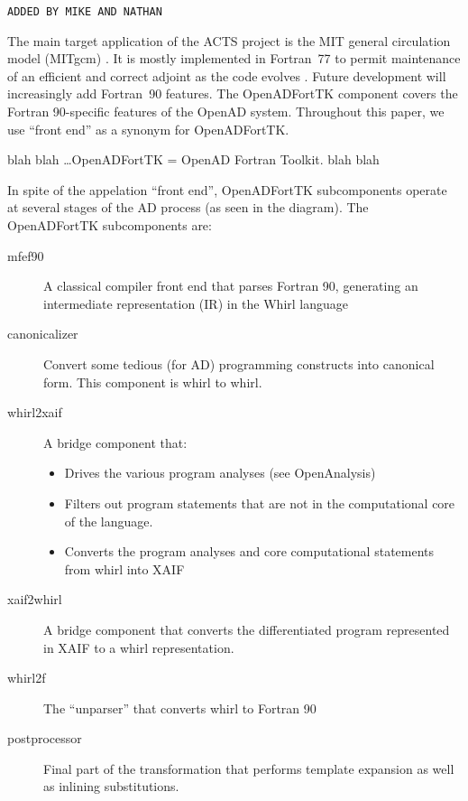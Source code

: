 \documentclass[acmtocl,acmnow]{acmtrans2m}
\begin{document}
{\tt ADDED BY MIKE AND NATHAN }

The main target application of the ACTS project is the MIT general circulation
model (MITgcm) \cite{mars-eta:97b,mars-eta:97a}. 
It is mostly implemented in Fortran~77 to permit maintenance of an efficient
and correct adjoint as the code evolves \cite{HHG02}. Future development will
increasingly add Fortran~90 features. 
The OpenADFortTK component covers the Fortran 90-specific features of
the OpenAD system. Throughout this paper, we use ``front end'' as a
synonym for OpenADFortTK. 

blah blah \ldots OpenADFortTK = OpenAD Fortran Toolkit. blah blah

In spite of the appelation ``front end'', OpenADFortTK subcomponents
operate at several stages of the AD process (as seen in the diagram).
The OpenADFortTK subcomponents are:

   \begin{description}
     \item[mfef90] A classical compiler front end that parses
       Fortran 90, generating an intermediate representation (IR)
       in the Whirl language

     \item[canonicalizer] Convert some tedious (for AD) 
        programming constructs into canonical form. This component
        is whirl to whirl.

     \item[whirl2xaif] A bridge component that:
        \begin{itemize}
           \item Drives the various program analyses (see OpenAnalysis)
        
           \item Filters out program statements that are not in the
                 computational core of the language.

           \item Converts the program analyses and core computational
                 statements from whirl into XAIF
	\end{itemize}

     \item[xaif2whirl] A bridge component that converts the 
        differentiated program represented in XAIF
        to a whirl representation.

     \item[whirl2f] The ``unparser'' that converts whirl to
        Fortran 90

     \item[postprocessor] Final part of the transformation that
        performs template expansion as well as inlining substitutions.

   \end{description}
\end{document}

